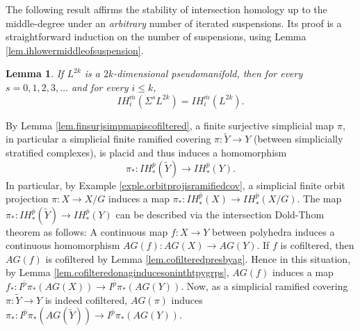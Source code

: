\documentclass{amsart}
\newtheorem{lemma}[thm]{Lemma}
\theoremstyle{definition}
\theoremstyle{remark}
\newcommand {\bp}    {{\ensuremath{\bar{p}}}}
\newcommand {\bm}    {{\ensuremath{\bar{m}}}}
\begin{document}
The following result affirms the stability of  
intersection homology up to the middle-degree
under an \emph{arbitrary} number of iterated suspensions.
Its proof is a straightforward induction on the number of suspensions,
using Lemma \ref{lem.ihlowermiddleofsuspension}.
\begin{lemma} \label{lem.ihmiddledegstablesuspension}
If $L^{2k}$ is a $2k$-dimensional pseudomanifold, then for every
$s=0,1,2,3,\ldots$ and for every $i\leq k$,
\[ IH^\bm_i (\Sigma^s L^{2k}) = IH^\bm_i (L^{2k}).  \]
\end{lemma}



By Lemma \ref{lem.finsurjsimpmapiscofiltered},
a finite surjective simplicial map $\pi$, in particular
a simplicial finite ramified covering $\pi: \widetilde{Y} \to Y$
(between simplicially stratified complexes), is placid and thus
induces a homomorphism
\[ \pi_*: IH^{\bar{p}}_* (\widetilde{Y}) \longrightarrow IH^{\bar{p}}_* (Y).  \]
In particular, by Example \ref{exple.orbitprojisramifiedcov},
a simplicial finite orbit projection $\pi: X \to X/G$
induces a map
$\pi_*: IH^{\bar{p}}_* (X) \to IH^{\bar{p}}_* (X/G).$
The map
$\pi_*: IH^{\bar{p}}_* (\widetilde{Y}) \to IH^{\bar{p}}_* (Y)$
can be described via the intersection Dold-Thom theorem as follows:
A continuous map $f: X \to Y$ between polyhedra induces a continuous homomorphism
$AG(f): AG(X) \to AG(Y)$.
If $f$ is cofiltered, then $AG(f)$ is cofiltered by Lemma \ref{lem.cofilteredpresbyag}.
Hence in this situation, 
by Lemma \ref{lem.cofilteredonaginducesoninthtpygrps}, $AG(f)$ induces a map
$f_*: I^\bp \pi_* (AG(X)) \to I^\bp \pi_* (AG(Y)).$
Now, as a simplicial ramified covering $\pi: \widetilde{Y} \to Y$ is
indeed cofiltered, $AG (\pi)$ induces 
$\pi_*: I^\bp \pi_* (AG(\widetilde{Y})) \longrightarrow
I^\bp \pi_* (AG(Y)).$
\end{document}
